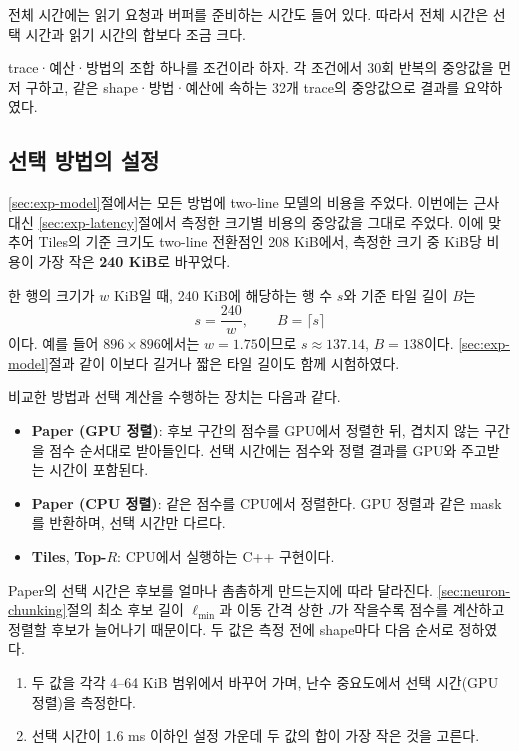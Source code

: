 전체 시간에는 읽기 요청과 버퍼를 준비하는 시간도 들어 있다. 따라서 전체 시간은 선택 시간과 읽기 시간의 합보다 조금 크다.

trace·예산·방법의 조합 하나를 조건이라 하자. 각 조건에서 30회 반복의 중앙값을 먼저 구하고, 같은 shape·방법·예산에 속하는 32개 trace의 중앙값으로 결과를 요약하였다.

\subsection{선택 방법의 설정}\label{sec:exp-real-methods}

\ref{sec:exp-model}절에서는 모든 방법에 two-line 모델의 비용을 주었다. 이번에는 근사 대신 \ref{sec:exp-latency}절에서 측정한 크기별 비용의 중앙값을 그대로 주었다. 이에 맞추어 Tiles의 기준 크기도 two-line 전환점인 208 KiB에서, 측정한 크기 중 KiB당 비용이 가장 작은 \textbf{240 KiB}로 바꾸었다.

한 행의 크기가 $w$ KiB일 때, 240 KiB에 해당하는 행 수 $s$와 기준 타일 길이 $B$는
\[
s=\frac{240}{w},
\qquad
B=\lceil s\rceil
\]
이다. 예를 들어 $896\times896$에서는 $w=1.75$이므로 $s\approx137.14$, $B=138$이다. \ref{sec:exp-model}절과 같이 이보다 길거나 짧은 타일 길이도 함께 시험하였다.

비교한 방법과 선택 계산을 수행하는 장치는 다음과 같다.

\begin{itemize}
\item \textbf{Paper (GPU 정렬)}: 후보 구간의 점수를 GPU에서 정렬한 뒤, 겹치지 않는 구간을 점수 순서대로 받아들인다. 선택 시간에는 점수와 정렬 결과를 GPU와 주고받는 시간이 포함된다.
\item \textbf{Paper (CPU 정렬)}: 같은 점수를 CPU에서 정렬한다. GPU 정렬과 같은 mask를 반환하며, 선택 시간만 다르다.
\item \textbf{Tiles}, \textbf{Top-$R$}: CPU에서 실행하는 C++ 구현이다.
\end{itemize}

Paper의 선택 시간은 후보를 얼마나 촘촘하게 만드는지에 따라 달라진다. \ref{sec:neuron-chunking}절의 최소 후보 길이 $\ell_{\min}$과 이동 간격 상한 $J$가 작을수록 점수를 계산하고 정렬할 후보가 늘어나기 때문이다. 두 값은 측정 전에 shape마다 다음 순서로 정하였다.

\begin{enumerate}
\item 두 값을 각각 4--64 KiB 범위에서 바꾸어 가며, 난수 중요도에서 선택 시간(GPU 정렬)을 측정한다.
\item 선택 시간이 1.6 ms 이하인 설정 가운데 두 값의 합이 가장 작은 것을 고른다.
\end{enumerate}

